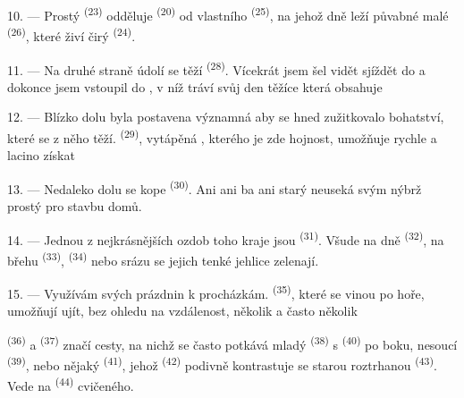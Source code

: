 10. --- Prostý  \textsuperscript{(23)} odděluje 
\textsuperscript{(20)} od vlastního  \textsuperscript{(25)}, na jehož dně leží
půvabné malé  \textsuperscript{(26)}, které živí čirý
 \textsuperscript{(24)}.

11. --- Na druhé straně údolí se těží  \textsuperscript{(28)}. Vícekrát
jsem šel vidět  sjíždět do  a dokonce jsem vstoupil do
, v níž tráví svůj den těžíce  která obsahuje

12. --- Blízko dolu byla postavena významná  aby se hned zužitkovalo bohatství,
které se z něho těží.  \textsuperscript{(29)}, vytápěná
, kterého je zde hojnost, umožňuje rychle a lacino získat

13. --- Nedaleko dolu se kope  \textsuperscript{(30)}. Ani  ani
 ba ani  starý  neuseká svým
 nýbrž prostý  pro stavbu domů.

14. --- Jednou z nejkrásnějších ozdob toho kraje jsou  \textsuperscript{(31)}.
Všude na dně  \textsuperscript{(32)}, na břehu
 \textsuperscript{(33)},  \textsuperscript{(34)} nebo
srázu se jejich tenké jehlice zelenají.

\VUsaut{3.0mm}
\VUsaut{3.0mm}

15. --- Využívám svých prázdnin k  procházkám. 
\textsuperscript{(35)}, které se vinou po hoře, umožňují ujít, bez ohledu na vzdálenost,
několik  a často několik 

 \textsuperscript{(36)} a 
\textsuperscript{(37)} značí cesty, na nichž se často potkává mladý 
\textsuperscript{(38)} s  \textsuperscript{(40)} po boku, nesoucí
 \textsuperscript{(39)}, nebo nějaký 
\textsuperscript{(41)}, jehož  \textsuperscript{(42)} podivně kontrastuje se
starou roztrhanou  \textsuperscript{(43)}. Vede na
 \textsuperscript{(44)} cvičeného.

